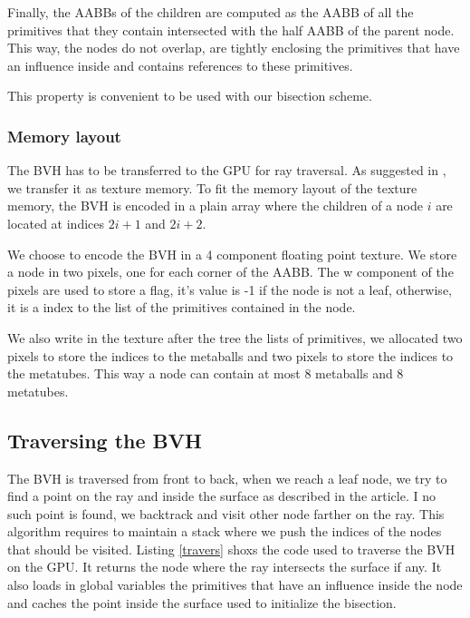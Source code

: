 \documentclass[11pt,a4paper,english]{article}
\begin{document}
Finally, the AABBs of the children are computed as the AABB of all the primitives that they contain intersected with the half AABB of the parent node.
This way, the nodes do not overlap, are tightly enclosing the primitives that have an influence inside and contains references to these primitives.

This property is convenient to be used with our bisection scheme.


\subsubsection{Memory layout}

The BVH has to be transferred to the GPU for ray traversal. As suggested in \cite{}, we transfer it as texture memory.
To fit the memory layout of the texture memory, the BVH is encoded in a plain array where the children of a node $i$ are located at indices $2i+1$ and $2i+2$.

We choose to encode the BVH in a 4 component floating point texture. We store a node in two pixels, one for each corner of the AABB.
The w component of the pixels are used to store a flag, it's value is -1 if the node is not a leaf, otherwise, it is a index to the list of the primitives contained in the node.

We also write in the texture after the tree the lists of primitives, we allocated two pixels to store the indices to the metaballs and two pixels to store the indices to the metatubes. This way a node can contain at most 8 metaballs and 8 metatubes. 

\subsection{Traversing the BVH}

The BVH is traversed from front to back, when we reach a leaf node, we try to find a point on the ray and inside the surface as described in the article. I no such point is found, we backtrack and visit other node farther on the ray. This algorithm requires to maintain a stack where we push the indices of the nodes that should be visited. Listing \ref{travers} shoxs the code used to traverse the BVH on the GPU. It returns the node where the ray intersects the surface if any. It also loads in global variables the primitives that have an influence inside the node and caches the point inside the surface used to initialize the bisection.

 

\end{document}
